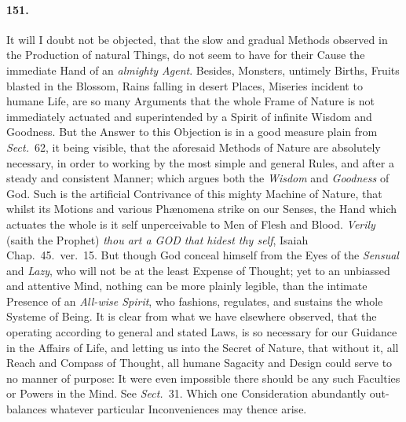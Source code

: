 \documentclass[]{article}
\newenvironment{sectionbody}{\begin{multicols}{2}}{\end{multicols}}
\begin{document}
\begin{sectionbody}
\paragraph{151.} It will I doubt not be objected, that the slow and gradual
Methods observed in the Production of natural Things, do not seem
to have for their Cause the immediate Hand of an \emph{almighty
Agent}.  Besides, Monsters, untimely Births, Fruits blasted in
the Blossom, Rains falling in desert Places, Miseries incident to
humane Life, are so many Arguments that the whole Frame of Nature
is not immediately actuated and superintended by a Spirit of
infinite Wisdom and Goodness.  But the Answer to this Objection
is in a good measure plain from \emph{Sect.}~62, it being visible,
that the aforesaid Methods of Nature are absolutely necessary, in
order to working by the most simple and general Rules, and after
a steady and consistent Manner; which argues both the
\emph{Wisdom} and \emph{Goodness} of {\sc God}.  Such is the
artificial Contrivance of this mighty Machine of Nature, that
whilst its Motions and various Ph{\ae}nomena strike on our
Senses, the Hand which actuates the whole is it self
unperceivable to Men of Flesh and Blood.  \emph{Verily} (saith
the Prophet) \emph{thou art a GOD that hidest thy self}, Isaiah
Chap.~45.\ ver.~15.  But though {\sc God} conceal himself from
the Eyes of the \emph{Sensual} and \emph{Lazy}, who will not be
at the least Expense of Thought; yet to an unbiassed and
attentive Mind, nothing can be more plainly legible, than the
intimate Presence of an \emph{All-wise Spirit}, who fashions,
regulates, and sustains the whole Systeme of Being.  It is clear
from what we have elsewhere observed, that the operating
according to general and stated Laws, is so necessary for our
Guidance in the Affairs of Life, and letting us into the Secret
of Nature, that without it, all Reach and Compass of Thought, all
humane Sagacity and Design could serve to no manner of purpose:
It were even impossible there should be any such Faculties or
Powers in the Mind.  See \emph{Sect.}~31.  Which one Consideration
abundantly out-balances whatever particular Inconveniences may
thence arise.




\end{sectionbody}
\end{document}
